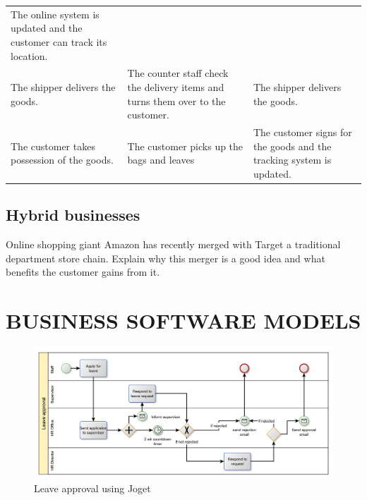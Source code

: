\documentclass[]{book}
\let\BeginKnitrBlock\begin \let\EndKnitrBlock\end
\begin{document}
\begin{longtable}[]{@{}lll@{}}
\begin{minipage}[t]{0.38\columnwidth}
The online system is updated and the customer can track its location.\strut
\end{minipage}\tabularnewline
\begin{minipage}[t]{0.15\columnwidth}\raggedright
The shipper delivers the goods.\strut
\end{minipage} & \begin{minipage}[t]{0.38\columnwidth}\raggedright
The counter staff check the delivery items and turns them over to the customer.\strut
\end{minipage} & \begin{minipage}[t]{0.38\columnwidth}\raggedright
The shipper delivers the goods.\strut
\end{minipage}\tabularnewline
\begin{minipage}[t]{0.15\columnwidth}\raggedright
The customer takes possession of the goods.\strut
\end{minipage} & \begin{minipage}[t]{0.38\columnwidth}\raggedright
The customer picks up the bags and leaves\strut
\end{minipage} & \begin{minipage}[t]{0.38\columnwidth}\raggedright
The customer signs for the goods and the tracking system is updated.\strut
\end{minipage}\tabularnewline
\bottomrule
\end{longtable}

\BeginKnitrBlock{rmddiscussion}
\hypertarget{hybrid-businesses}{%
\section{Hybrid businesses}\label{hybrid-businesses}}

Online shopping giant Amazon has recently merged with Target a traditional department store chain. Explain why this merger is a good idea and what benefits the customer gains from it.
\EndKnitrBlock{rmddiscussion}

\hypertarget{business-software-models}{%
\chapter{BUSINESS SOFTWARE MODELS}\label{business-software-models}}

\begin{figure}
\includegraphics[width=1\linewidth]{images/jogetprocess} \caption{Leave approval using Joget}\label{fig:unnamed-chunk-1}
\end{figure}
\end{document}
